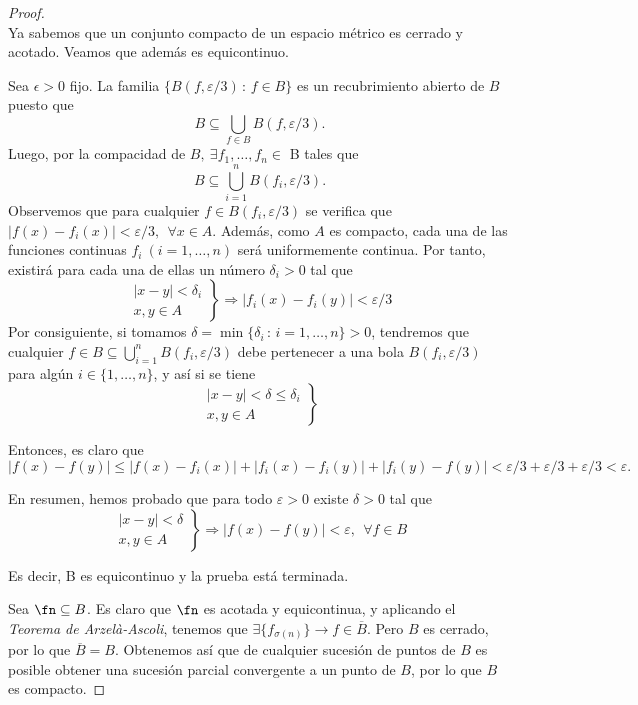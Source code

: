   \begin{proof} \hfill \\
    \boxed{\Rightarrow} Ya sabemos que un conjunto compacto de un espacio métrico es cerrado y acotado. Veamos que además es equicontinuo.

    Sea $\epsilon >0$ fijo. La familia $\{ B(f, \varepsilon/3) \, : \, f\in B\}$ es un recubrimiento abierto de $B$ puesto que $$B\subseteq \bigcup_{f\in B} B(f, \varepsilon/3).$$
    Luego, por la compacidad de $B,\ \exists f_1, \dots, f_n \in$ B tales que $$B \subseteq \displaystyle \bigcup_{i=1}^n B(f_i, \varepsilon/3).$$
    Observemos que para cualquier $f\in B(f_i, \varepsilon/3)$ se verifica que
    $|f(x)-f_i(x)| < \varepsilon/3 , \ \ \forall x\in A$. Además, como $A$ es compacto, cada una de las funciones continuas $f_i \ (i=1,\dots,n)$ será uniformemente continua. Por tanto, existirá para cada una de ellas un número $\delta_i>0$ tal que $$\left. \begin{array}{c} |x-y|<\delta_i \\ x,y\in A \end{array}  \right\} \Rightarrow |f_i(x)-f_i(y)| <\varepsilon/3$$
    Por consiguiente, si tomamos $\delta = \min \{\delta_i \, :\, i=1,\dots,n\} >0$, tendremos que cualquier $f\in B \subseteq \bigcup_{i=1}^n B(f_i, \varepsilon/3)$ debe pertenecer a una bola $B(f_i, \varepsilon/3)$ para algún $i\in\{1,\dots ,n\}$, y así si se tiene $$\left. \begin{array}{c} |x-y|<\delta \leq \delta_i \\ x,y\in A \end{array}  \right\}$$

    Entonces, es claro que $\displaystyle |f(x)-f(y)| \le |f(x)-f_i(x)|+|f_i(x)-f_i(y)|+|f_i(y)-f(y)| < \varepsilon/3+\varepsilon/3+\varepsilon/3<\varepsilon.$

    En resumen, hemos probado que para todo $\varepsilon >0$ existe $\delta >0$ tal que $$ \left. \begin{array}{c} |x-y|<\delta  \\ x,y\in A \end{array}  \right\} \Rightarrow |f(x)-f(y)| <\varepsilon , \ \ \forall f\in B$$

    Es decir, B es equicontinuo y la prueba está terminada.

    \boxed{\Leftarrow} Sea $\fn \subseteq B$. Es claro que $\fn$ es acotada y equicontinua, y aplicando el \textit{Teorema de Arzelà-Ascoli}, tenemos que $\exists \{f_{\sigma(n)}\} \to f \in \overline{B}$. Pero $B$ es cerrado, por lo que $\overline{B} = B$. Obtenemos así que de cualquier sucesión de puntos de $B$ es posible obtener una sucesión parcial convergente a un punto de $B$, por lo que $B$ es compacto.
  \end{proof}

